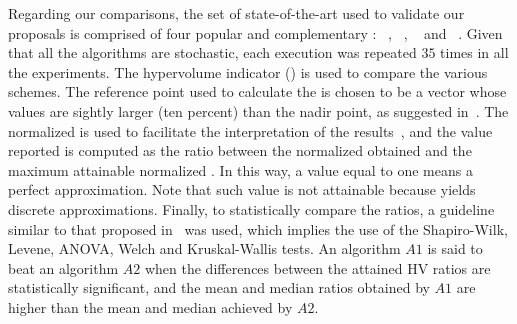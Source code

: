 Regarding our comparisons, the set of state-of-the-art \MOEAS{} used to validate our proposals is comprised of four 
popular and complementary \MOEAS{}: \NSGAII{}~\cite{deb2002fast}, \MOEADDE{}~\cite{zhang2009performance}, \RMOEA{}~\cite{trautmann2013r2} 
and \NSGAIII{}~\cite{deb2013evolutionary}.
%
%
%
Given that all the algorithms are stochastic, each execution was repeated $35$ times in all the experiments.
%
The hypervolume indicator (\HV{}) is used to compare the various schemes.
%
The reference point used to calculate the \HV{} is chosen to be a vector whose values are sightly larger (ten percent) 
than the nadir point, as suggested in~\cite{ishibuchi2017reference}.
%
The normalized \HV{} is used to facilitate the interpretation of the results~\cite{li2014evolutionary}, 
and the value reported is computed as the ratio between the normalized \HV{} obtained and the maximum attainable normalized \HV{}.
%
In this way, a value equal to one means a perfect approximation.
%
Note that such value is not attainable because \MOEAS{} yields discrete approximations.
%
Finally, to statistically compare the \HV{} ratios, a guideline similar to that proposed in~\cite{durillo2010study} was used, 
which implies the use of the Shapiro-Wilk, Levene, ANOVA, Welch and Kruskal-Wallis tests.
%
An algorithm $A1$ is said to beat an algorithm $A2$ when the differences between the attained HV ratios are statistically significant, 
and the mean and median \HV{} ratios obtained by $A1$ are higher than the mean and median achieved by $A2$.

%
%
%
%
%

